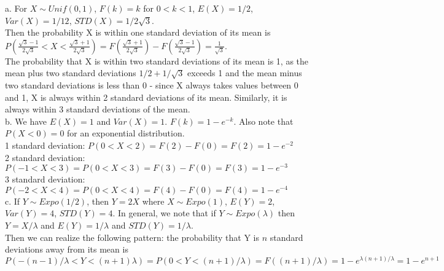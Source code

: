 a. For \(X \sim Unif(0,1)\), \(F(k) = k\) for \(0<k<1\), \(E(X) = 1/2\), \(Var(X) = 1/12\), \(STD(X) = 1/2\sqrt{3}\).\\
Then the probability X is within one standard deviation of its mean is \(P(\frac{\sqrt{3}-1}{2\sqrt{3}} < X < \frac{\sqrt{3}+1}{2\sqrt{3}}) = F(\frac{\sqrt{3}+1}{2\sqrt{3}}) - F(\frac{\sqrt{3}-1}{2\sqrt{3}}) = \frac{1}{\sqrt{3}}\). \\

The probability that X is within two standard deviations of its mean is 1, as the mean plus two standard deviations \(1/2+1/\sqrt{3}\) exceeds 1 and the mean minus two standard deviations is less than 0 - since X always takes values between 0 and 1, X is always within 2 standard deviations of its mean. Similarly, it is always within 3 standard deviations of the mean. \\

b. We have \(E(X) = 1\) and \(Var(X) = 1\). \(F(k) = 1-e^{-k}\). Also note that \(P(X<0) = 0\) for an exponential distribution. \\

1 standard deviation: \(P(0<X<2) = F(2)-F(0) = F(2) = 1-e^{-2}\)\\
2 standard deviation: \(P(-1<X<3) =P(0<X<3) =F(3)-F(0) = F(3) = 1-e^{-3}\)\\
3 standard deviation: \(P(-2<X<4) =P(0<X<4) =F(4)-F(0) = F(4) = 1-e^{-4}\)\\

c. If \(Y \sim Expo(1/2)\), then \(Y=2X\) where \(X\sim Expo(1)\), \(E(Y)=2\), \(Var(Y)=4\), \(STD(Y) = 4\). In general, we note that if \(Y \sim Expo(\lambda)\) then \(Y = X/\lambda\) and \(E(Y) = 1/\lambda\) and \(STD(Y) = 1/\lambda\). \\

Then we can realize the following pattern: the probability that Y is \(n\) standard deviations away from its mean is \(P(-(n-1)/\lambda < Y < (n+1)\lambda) = P(0<Y<(n+1)/\lambda) = F((n+1)/\lambda) = 1-e^{\lambda(n+1)/\lambda} = 1-e^{n+1}\)
